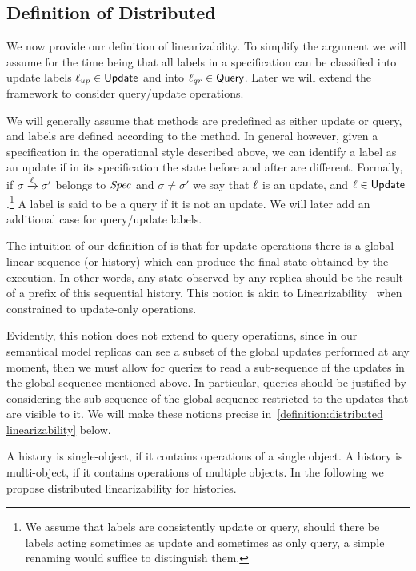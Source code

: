 \subsection{Definition of Distributed \CRDTLin{}}
\label{subsec:definition of distributed linearizability}

We now provide our definition of linearizability.
To simplify the argument we will assume for the time being that all
labels in a specification can be classified into update labels
$\ell_{up} \in \mathsf{Update}$ and into $\ell_{qr} \in \mathsf{Query}$.
Later we will extend the framework to consider query/update
operations.

We will generally assume that methods are predefined as either update
or query, and labels are defined according to the method.
In general however, given a specification in the operational style
described above, we can identify a label as an update if in its
specification the state before and after are different.
Formally, if $\sigma \xrightarrow{\ell} \sigma'$ belongs to $\mathit{Spec}$
and $\sigma \neq \sigma'$ we say that $\ell$ is an update, and
$\ell \in \mathsf{Update}$.\footnote{We assume that labels are
  consistently update or query, should there be labels acting sometimes
  as update and sometimes as only query, a simple renaming would suffice
  to distinguish them.}
A label is said to be a query if it is not an update.
We will later add an additional case for query/update labels.

The intuition of our definition of \crdtlin{} is that for update
operations there is a global linear sequence (or history) which can
produce the final state obtained by the execution.
In other words, any state observed by any replica should be the result
of a prefix of this sequential history.
This notion is akin to Linearizability~\cite{HerlihyW90} when
constrained to update-only operations.

Evidently, this notion does not extend to query operations, since in
our semantical model replicas can see a subset of the global updates
performed at any moment, then we must allow for queries to read a
sub-sequence of the updates in the global sequence mentioned above.
In particular, queries should be justified by considering the
sub-sequence of the global sequence restricted to the updates that are
visible to it.
We will make these notions precise in~\autoref{definition:distributed
  linearizability} below.


 {A history is
  single-object, if it contains operations of a single object.
  A history is multi-object, if it contains operations of multiple
  objects.}
In the following we propose distributed linearizability for histories.

